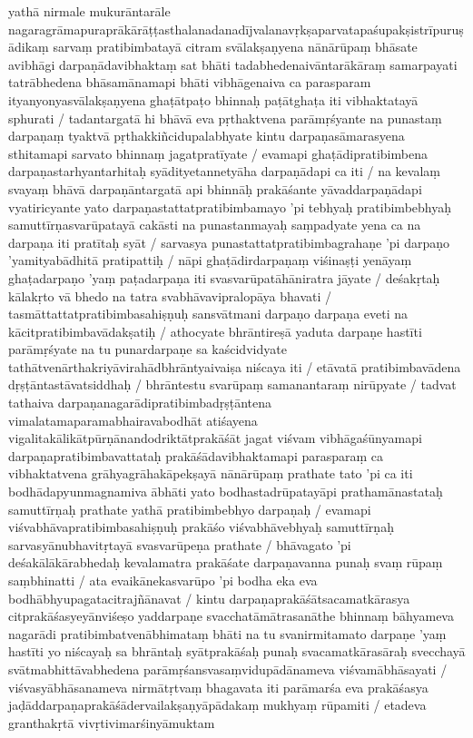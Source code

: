 yathā nirmale mukurāntarāle nagaragrāmapuraprākārāṭṭasthalanadanadījvalanavṛkṣaparvatapaśupakṣistrīpuruṣādikaṃ sarvaṃ pratibimbatayā citram svālakṣaṇyena nānārūpaṃ bhāsate avibhāgi darpaṇādavibhaktaṃ sat bhāti tadabhedenaivāntarākāraṃ samarpayati tatrābhedena bhāsamānamapi bhāti vibhāgenaiva ca parasparam ityanyonyasvālakṣaṇyena ghaṭātpaṭo bhinnaḥ paṭātghaṭa iti vibhaktatayā sphurati  / tadantargatā hi bhāvā eva pṛthaktvena parāmṛśyante na punastaṃ darpaṇaṃ tyaktvā pṛthakkiñcidupalabhyate kintu darpaṇasāmarasyena sthitamapi sarvato bhinnaṃ jagatpratīyate  / evamapi ghaṭādipratibimbena darpaṇastarhyantarhitaḥ syādityetannetyāha darpaṇādapi ca iti  / na kevalaṃ svayaṃ bhāvā darpaṇāntargatā api bhinnāḥ prakāśante yāvaddarpaṇādapi vyatiricyante yato darpaṇastattatpratibimbamayo 'pi tebhyaḥ pratibimbebhyaḥ samuttīrṇasvarūpatayā cakāsti na punastanmayaḥ saṃpadyate yena ca na darpaṇa iti pratītaḥ syāt  / sarvasya punastattatpratibimbagrahaṇe 'pi darpaṇo 'yamityabādhitā pratipattiḥ  / nāpi ghaṭādirdarpaṇaṃ viśinaṣṭi yenāyaṃ ghaṭadarpaṇo 'yaṃ paṭadarpaṇa iti svasvarūpatāhāniratra jāyate  / deśakṛtaḥ kālakṛto vā bhedo na tatra svabhāvavipralopāya bhavati  / tasmāttattatpratibimbasahiṣṇuḥ sansvātmani darpaṇo darpaṇa eveti na kācitpratibimbavādakṣatiḥ  / athocyate bhrāntireṣā yaduta darpaṇe hastīti parāmṛśyate na tu punardarpaṇe sa kaścidvidyate tathātvenārthakriyāvirahādbhrāntyaivaiṣa niścaya iti  / etāvatā pratibimbavādena dṛṣṭāntastāvatsiddhaḥ  / bhrāntestu svarūpaṃ samanantaraṃ nirūpyate  / tadvat tathaiva darpaṇanagarādipratibimbadṛṣṭāntena vimalatamaparamabhairavabodhāt atiśayena vigalitakālikātpūrṇānandodriktātprakāśāt jagat viśvam vibhāgaśūnyamapi darpaṇapratibimbavattataḥ prakāśādavibhaktamapi parasparaṃ ca vibhaktatvena grāhyagrāhakāpekṣayā nānārūpaṃ prathate tato 'pi ca iti bodhādapyunmagnamiva ābhāti yato bodhastadrūpatayāpi prathamānastataḥ samuttīrṇaḥ prathate yathā pratibimbebhyo darpaṇaḥ
/ evamapi viśvabhāvapratibimbasahiṣṇuḥ prakāśo viśvabhāvebhyaḥ samuttīrṇaḥ sarvasyānubhavitṛtayā svasvarūpeṇa prathate  / bhāvagato 'pi deśakālākārabhedaḥ kevalamatra prakāśate darpaṇavanna punaḥ svaṃ rūpaṃ saṃbhinatti  / ata evaikānekasvarūpo 'pi bodha eka eva bodhābhyupagatacitrajñānavat  / kintu darpaṇaprakāśātsacamatkārasya citprakāśasyeyānviśeṣo yaddarpaṇe svacchatāmātrasanāthe bhinnaṃ bāhyameva nagarādi pratibimbatvenābhimataṃ bhāti na tu svanirmitamato darpaṇe 'yaṃ hastīti yo niścayaḥ sa bhrāntaḥ syātprakāśaḥ punaḥ svacamatkārasāraḥ svecchayā svātmabhittāvabhedena parāmṛśansvasaṃvidupādānameva viśvamābhāsayati  / viśvasyābhāsanameva nirmātṛtvaṃ bhagavata iti parāmarśa eva prakāśasya jaḍāddarpaṇaprakāśādervailakṣaṇyāpādakaṃ mukhyaṃ rūpamiti  / etadeva granthakṛtā vivṛtivimarśinyāmuktam

